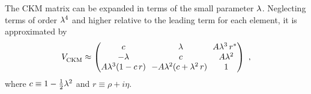 
The CKM matrix can be expanded in terms of the small parameter $\lambda$. Neglecting terms of order $\lambda^4$ and higher relative to the
leading term for each element, it is approximated by \cite{Charles:2004jd}
\begin{equation}
  \label{eq:CKMApprox}
  \VCKM \approx
    \begin{pmatrix}
      c                  &  \lam                           &  \!\! A\lam^3\,r^* \\
      -\lam              &  c                              &  A\lam^2           \\
      A\lam^3(1 - c\,r)  &  \!\! -A\lam^2 (c + \lam^2\,r)  &  1
    \end{pmatrix}
    \ ,
\end{equation}
where $c\equiv1 - \tfrac{1}{2}\lambda^2$ and $r\equiv\rho+i\eta$.

